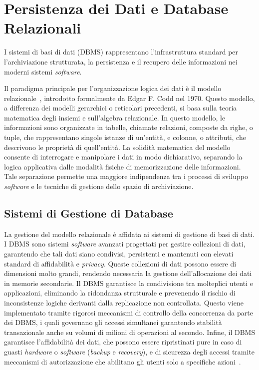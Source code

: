 \section{Persistenza dei Dati e Database Relazionali}
I sistemi di basi di dati (DBMS) rappresentano l'infrastruttura standard per l'archiviazione strutturata, la persistenza e il recupero delle informazioni nei moderni sistemi \textit{software}.

Il paradigma principale per l'organizzazione logica dei dati è il modello relazionale~\autocite[ch. 2]{atzeniBasiDiDati2009}, introdotto formalmente da Edgar F. Codd nel 1970. Questo modello, a differenza dei modelli gerarchici o reticolari precedenti, si basa sulla teoria matematica degli insiemi e sull'algebra relazionale. In questo modello, le informazioni sono organizzate in tabelle, chiamate relazioni, composte da righe, o tuple, che rappresentano singole istanze di un'entità, e colonne, o attributi, che descrivono le proprietà di quell'entità. La solidità matematica del modello consente di interrogare e manipolare i dati in modo dichiarativo, separando la logica applicativa dalle modalità fisiche di memorizzazione delle informazioni. Tale separazione permette una maggiore indipendenza tra i processi di sviluppo \textit{software} e le tecniche di gestione dello spazio di archiviazione.

\subsection{Sistemi di Gestione di Database}
La gestione del modello relazionale è affidata ai sistemi di gestione di basi di dati. I DBMS sono sistemi \textit{software} avanzati progettati per gestire collezioni di dati, garantendo che tali dati siano condivisi, persistenti e mantenuti con elevati standard di affidabilità e \textit{privacy}. Queste collezioni di dati possono essere di dimensioni molto grandi, rendendo necessaria la gestione dell'allocazione dei dati in memorie secondarie. Il DBMS garantisce la condivisione tra molteplici utenti e applicazioni, eliminando la ridondanza strutturale e prevenendo il rischio di inconsistenze logiche derivanti dalla replicazione non controllata. Questo viene implementato tramite rigorosi meccanismi di controllo della concorrenza da parte dei DBMS, i quali governano gli accessi simultanei garantendo stabilità transazionale anche su volumi di milioni di operazioni al secondo. Infine, il DBMS garantisce l'affidabilità dei dati, che possono essere ripristinati pure in caso di guasti \textit{hardware} o \textit{software} (\textit{backup} e \textit{recovery}), e di sicurezza degli accessi tramite meccanismi di autorizzazione che abilitano gli utenti solo a specifiche azioni~\autocite[ch. 1.2]{atzeniBasiDiDati2009}.


